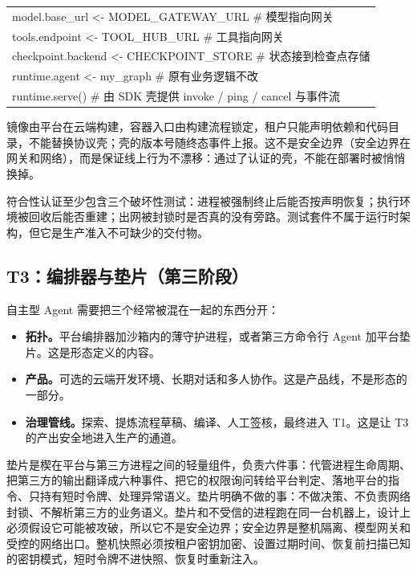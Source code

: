 \begin{codebox}
\begin{tabular}{@{}l@{}}
model.base\_url      <- MODEL\_GATEWAY\_URL      \# 模型指向网关\\
tools.endpoint      <- TOOL\_HUB\_URL           \# 工具指向网关\\
checkpoint.backend  <- CHECKPOINT\_STORE       \# 状态接到检查点存储\\
runtime.agent       <- my\_graph               \# 原有业务逻辑不改\\
runtime.serve()     \# 由 SDK 壳提供 invoke / ping / cancel 与事件流
\end{tabular}
\end{codebox}

镜像由平台在云端构建，容器入口由构建流程锁定，租户只能声明依赖和代码目录，不能替换协议壳；壳的版本号随终态事件上报。这不是安全边界（安全边界在网关和网络），而是保证线上行为不漂移：通过了认证的壳，不能在部署时被悄悄换掉。

符合性认证至少包含三个破坏性测试：进程被强制终止后能否按声明恢复；执行环境被回收后能否重建；出网被封锁时是否真的没有旁路。测试套件不属于运行时架构，但它是生产准入不可缺少的交付物。

\subsection{T3：编排器与垫片（第三阶段）}

自主型 Agent 需要把三个经常被混在一起的东西分开：

\begin{itemize}
  \item \textbf{拓扑。}平台编排器加沙箱内的薄守护进程，或者第三方命令行 Agent 加平台垫片。这是形态定义的内容。
  \item \textbf{产品。}可选的云端开发环境、长期对话和多人协作。这是产品线，不是形态的一部分。
  \item \textbf{治理管线。}探索、提炼流程草稿、编译、人工签核，最终进入 T1。这是让 T3 的产出安全地进入生产的通道。
\end{itemize}

垫片是楔在平台与第三方进程之间的轻量组件，负责六件事：代管进程生命周期、把第三方的输出翻译成六种事件、把它的权限询问转给平台判定、落地平台的指令、只持有短时令牌、处理异常语义。垫片明确不做的事：不做决策、不负责网络封锁、不解析第三方的业务语义。垫片和不受信的进程跑在同一台机器上，设计上必须假设它可能被攻破，所以它不是安全边界；安全边界是整机隔离、模型网关和受控的网络出口。整机快照必须按租户密钥加密、设置过期时间、恢复前扫描已知的密钥模式，短时令牌不进快照、恢复时重新注入。
